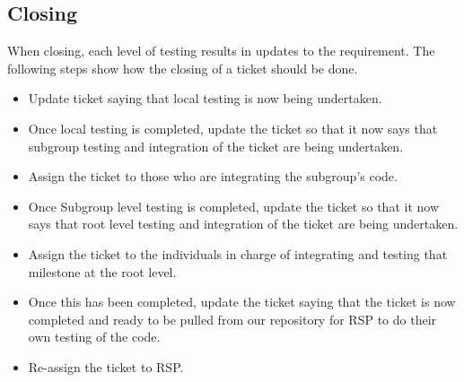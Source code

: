 \documentclass{article}
\begin{document}
\subsection{Closing}
When closing, each level of testing results in updates to the requirement. The following steps show how the closing of a ticket should be done.
\begin{itemize}
\item Update ticket saying that local testing is now being undertaken.
\item Once local testing is completed, update the ticket so that it now says that subgroup testing and integration of the ticket are being undertaken.
\item Assign the ticket to those who are integrating the subgroup's code.
\item Once Subgroup level testing is completed, update the ticket so that it now says that root level testing and integration of the ticket are being undertaken.
\item Assign the ticket to the individuals in charge of integrating and testing that milestone at the root level.
\item Once this has been completed, update the ticket saying that the ticket is now completed and ready to be pulled from our repository for RSP to do their own testing of the code.
\item Re-assign the ticket to RSP.
\end{itemize}
\end{document}
